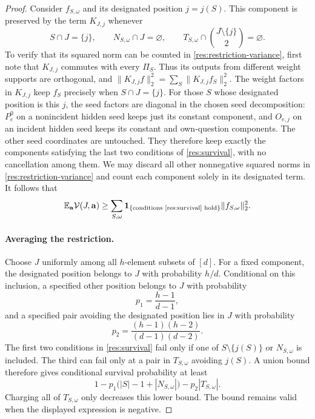 \begin{proof}
Consider \(f_{S,\omega}\) and its designated position \(j=j(S)\).
This component is preserved by the term \(K_{J,j}\) whenever
\begin{equation}\label{res:survival}
 S\cap J=\{j\},\qquad
 N_{S,\omega}\cap J=\varnothing,\qquad
 T_{S,\omega}\cap\binom{J\setminus\{j\}}2=\varnothing.
\end{equation}
To verify that its squared norm can be counted in
\eqref{res:restriction-variance}, first note that \(K_{J,j}\) commutes
with every \(\Pi_S\).  Thus its outputs from different weight supports
are orthogonal, and
\(\|K_{J,j}f\|_2^2=\sum_S\|K_{J,j}f_S\|_2^2\).
The weight factors in \(K_{J,j}\) keep \(f_S\) precisely when
\(S\cap J=\{j\}\).  For those \(S\) whose designated position is
this \(j\), the seed factors are diagonal in the chosen seed
decomposition: \(P_e^0\) on a nonincident hidden seed keeps just its
constant component, and \(O_{e,j}\) on an incident hidden seed keeps
its constant and own-question components.  The other seed coordinates
are untouched.  They therefore keep exactly the components satisfying
the last two conditions of \eqref{res:survival}, with no cancellation
among them.  We may discard all other nonnegative squared norms in
\eqref{res:restriction-variance} and count each component solely in its
designated term.  It follows that
\begin{equation}\label{res:surviving-energy}
 \mathbb E_{\mathbf a}\mathcal V(J,\mathbf a)
   \geq\sum_{S,\omega}
       \mathbf1_{\{\text{conditions \eqref{res:survival} hold}\}}
       \|f_{S,\omega}\|_2^2.
\end{equation}

\paragraph{Averaging the restriction.}
Choose \(J\) uniformly among all \(h\)-element subsets of \([d]\).
For a fixed component, the designated position belongs to \(J\) with
probability \(h/d\).  Conditional on this inclusion, a specified other
position belongs to \(J\) with probability
\[
 p_1=\frac{h-1}{d-1},
\]
and a specified pair avoiding the designated position lies in \(J\)
with probability
\[
 p_2=\frac{(h-1)(h-2)}{(d-1)(d-2)}.
\]
The first two conditions in \eqref{res:survival} fail only if one of
\(S\setminus\{j(S)\}\) or \(N_{S,\omega}\) is included.  The third
can fail only at a pair in \(T_{S,\omega}\) avoiding \(j(S)\).
A union bound therefore gives conditional survival probability at least
\begin{equation}\label{res:survival-probability}
 1-p_1\bigl(|S|-1+|N_{S,\omega}|\bigr)-p_2|T_{S,\omega}|.
\end{equation}
Charging all of \(T_{S,\omega}\) only decreases this lower bound.
The bound remains valid when the displayed expression is negative.


\end{proof}
